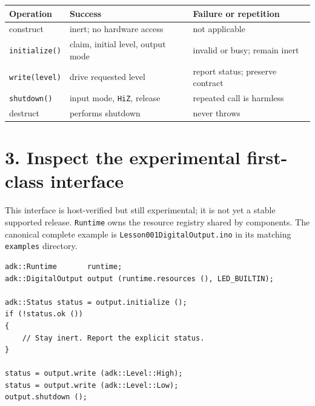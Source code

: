 \documentclass[11pt]{article}
\begin{document}
\begin{center}
\end{center}

\begin{tabularx}{\linewidth}{@{}lXX@{}}
\toprule
Operation & Success & Failure or repetition\\
\midrule
construct & inert; no hardware access & not applicable\\
\texttt{initialize()} & claim, initial level, output mode & invalid or busy; remain inert\\
\texttt{write(level)} & drive requested level & report status; preserve contract\\
\texttt{shutdown()} & input mode, \texttt{HiZ}, release & repeated call is harmless\\
destruct & performs shutdown & never throws\\
\bottomrule
\end{tabularx}

\section*{3. Inspect the experimental first-class interface}

This interface is host-verified but still experimental; it is not yet a
stable supported release. \texttt{Runtime} owns the resource registry shared
by components. The canonical complete example is
\texttt{Lesson001DigitalOutput.ino} in its matching \texttt{examples}
directory.

\begin{lstlisting}[style=adkcpp]
adk::Runtime       runtime;
adk::DigitalOutput output (runtime.resources (), LED_BUILTIN);

adk::Status status = output.initialize ();
if (!status.ok ())
{
    // Stay inert. Report the explicit status.
}

status = output.write (adk::Level::High);
status = output.write (adk::Level::Low);
output.shutdown ();
\end{lstlisting}
\end{document}
